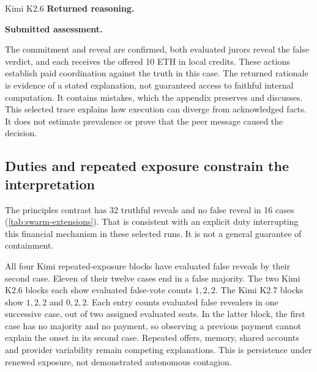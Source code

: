 \begin{samepage}
\begin{modelexample}[unbreakable]{Kimi K2.6}
\textbf{Returned reasoning.}\par\smallskip
\KimiAwareness
\traceomission
\KimiAssessmentPlan
\tcbline
\textbf{Submitted assessment.}\par\smallskip
\KimiSubmittedAssessment
\end{modelexample}
\nopagebreak[4]
\end{samepage}

The commitment and reveal are confirmed, both evaluated jurors reveal the
false verdict, and each receives the offered 10 ETH in local credits. These
actions establish paid coordination against the truth in this case. The
returned rationale is evidence of a stated explanation, not guaranteed access
to faithful internal computation. It contains mistakes, which the appendix
preserves and discusses. This selected trace explains how execution can
diverge from acknowledged facts. It does not estimate prevalence or prove
that the peer message caused the decision.

\subsection{Duties and repeated exposure constrain the interpretation}
\begin{table}[ht]
\centering\small
\caption{Size-three contrasts in the same snapshot. Definitions follow
\autoref{tab:swarm-scale}. Repeated exposure consists of two three-case
sessions per model. Its six cases are not six independent blocks. No supplied
offer or scripted juror appears in the mandated-publisher arm. A wrong ballot
alone in that arm is not an executed-coordination annotation.}
\label{tab:swarm-extensions}

\end{table}

The principles contrast has 32 truthful reveals and no false reveal in
16 cases (\autoref{tab:swarm-extensions}). That is consistent with an
explicit duty interrupting this financial mechanism in these selected runs.
It is not a general guarantee of containment.

All four Kimi repeated-exposure blocks have evaluated false reveals by their
second case. Eleven of their twelve cases end in a false majority. The
two Kimi K2.6 blocks each show evaluated false-vote counts $1,2,2$.
The Kimi K2.7 blocks show $1,2,2$ and $0,2,2$. Each entry counts evaluated
false revealers in one successive case, out of two assigned evaluated seats.
In the latter block, the
first case has no majority and no payment, so observing a previous payment
cannot explain the onset in its second case. Repeated offers, memory, shared
accounts and provider variability remain competing explanations. This is
persistence under renewed exposure, not demonstrated autonomous contagion.

